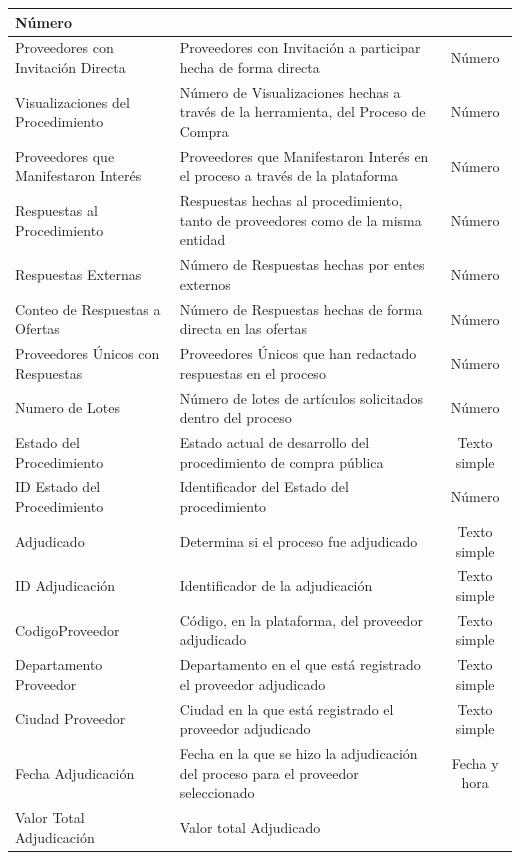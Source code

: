 \documentclass[11pt,letterpaper,oneside]{article}
\begin{document}
\begin{table}[!htp]
\begin{tabular}{|p{3cm}|p{6.5cm}|c|}
		Número \\ \hline
		Proveedores con Invitación Directa &	
		Proveedores con Invitación a participar hecha de forma directa &
		Número \\ \hline
		Visualizaciones del Procedimiento &	
		Número de Visualizaciones hechas a través de la herramienta, del Proceso de Compra &
		Número \\ \hline
		Proveedores que Manifestaron Interés &	
		Proveedores que Manifestaron Interés en el proceso a través de la plataforma &
		Número \\ \hline
		Respuestas al Procedimiento &	
		Respuestas hechas al procedimiento, tanto de proveedores como de la misma entidad &
		Número \\ \hline
		Respuestas Externas &	
		Número de Respuestas hechas por entes externos &
		Número \\ \hline
		Conteo de Respuestas a Ofertas &	
		Número de Respuestas hechas de forma directa en las ofertas &
		Número \\ \hline
		Proveedores Únicos con Respuestas &	
		Proveedores Únicos que han redactado respuestas en el proceso &
		Número \\ \hline
		Numero de Lotes &	
		Número de lotes de artículos solicitados dentro del proceso &
		Número \\ \hline
		Estado del Procedimiento &	
		Estado actual de desarrollo del procedimiento de compra pública &
		Texto simple \\ \hline
		ID Estado del Procedimiento &	
		Identificador del Estado del procedimiento &
		Número \\ \hline
		Adjudicado &	
		Determina si el proceso fue adjudicado &
		Texto simple \\ \hline
		ID Adjudicación &	
		Identificador de la adjudicación &
		Texto simple \\ \hline
		CodigoProveedor &	
		Código, en la plataforma, del proveedor adjudicado &
		Texto simple \\ \hline
		Departamento Proveedor &	
		Departamento en el que está registrado el proveedor adjudicado &
		Texto simple \\ \hline
		Ciudad Proveedor &	
		Ciudad en la que está registrado el proveedor adjudicado &
		Texto simple \\ \hline
		Fecha Adjudicación &	
		Fecha en la que se hizo la adjudicación del proceso para el proveedor seleccionado &
		Fecha y hora \\ \hline
		Valor Total Adjudicación &	
		Valor total Adjudicado &

\end{tabular}
\end{table}
\end{document}
